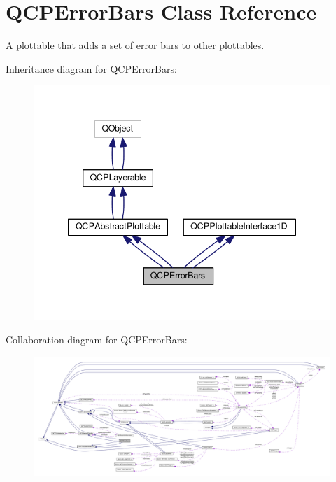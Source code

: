 \hypertarget{class_q_c_p_error_bars}{}\section{Q\+C\+P\+Error\+Bars Class Reference}
\label{class_q_c_p_error_bars}


A plottable that adds a set of error bars to other plottables.  




Inheritance diagram for Q\+C\+P\+Error\+Bars\+:\nopagebreak
\begin{figure}[H]
\begin{center}
\leavevmode
\includegraphics[width=339pt]{class_q_c_p_error_bars__inherit__graph}
\end{center}
\end{figure}


Collaboration diagram for Q\+C\+P\+Error\+Bars\+:\nopagebreak
\begin{figure}[H]
\begin{center}
\leavevmode
\includegraphics[width=350pt]{class_q_c_p_error_bars__coll__graph}
\end{center}
\end{figure}
